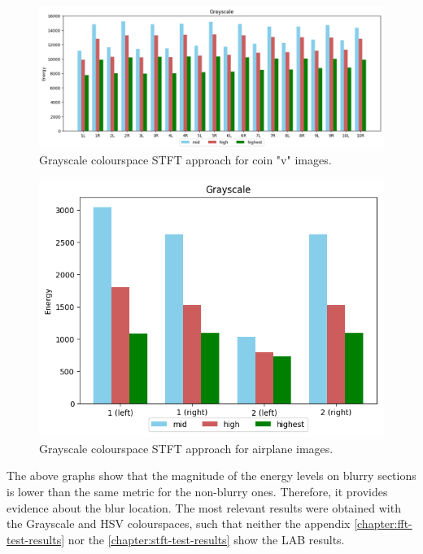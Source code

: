 \begin{figure}[ht]
	\centering
	\caption{\label{fig:stft_coin_v}Grayscale colourspace STFT approach for coin "v" images.}
	\begin{center}
	    \includegraphics[scale=0.52, trim = {0 1cm 0 1cm}]{images/fig23.png}
	\end{center}
	\centering
    \fautor
\end{figure}

\begin{figure}[ht]
	\centering
	\caption{\label{fig:stft_airplane}Grayscale colourspace STFT approach for airplane images.}
	\begin{center}
	    \includegraphics[scale=0.6, trim = {0 1cm 0 1cm}]{images/fig24.png}
	\end{center}
	\centering
    \fautor
\end{figure}

\noindent The above graphs show that the magnitude of the energy levels on blurry sections is lower than the same metric for the non-blurry ones. Therefore, it provides evidence about the blur location. The most relevant results were obtained with the Grayscale and HSV colourspaces, such that neither the appendix \ref{chapter:fft-test-results} nor the \ref{chapter:stft-test-results} show the LAB results.
